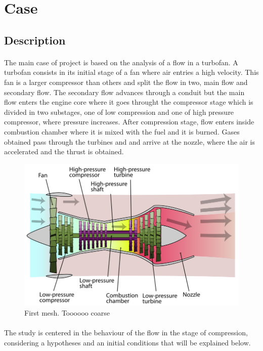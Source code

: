 \section{Case}
\subsection{Description}

\paragraph{}
The main case of project is based on the analysis of a flow in a turbofan. A turbofan consists in its initial stage of a fan where air entries a high velocity. This fan is a larger compressor than others and split the flow in two, main flow and secondary flow. The secondary flow advances through a conduit but the main flow enters the engine core where it goes throught the compressor stage which is divided in two substages, one of low compression and one of high pressure compressor, where pressure increases. After compression stage, flow enters inside combustion chamber where it is mixed with the fuel and it is burned. Gases obtained pass through the turbines and and arrive at the nozzle, where the air is accelerated and the thrust is obtained.

\begin{figure}[h!]
\centering
\includegraphics[scale=0.45]{./img/TurbofanEtapas.png}
\caption{First mesh. Toooooo coarse}
\end{figure}

\paragraph{}
The study is centered in the behaviour of the flow in the stage of compression, considering a hypotheses and an initial conditions that will be explained below.

